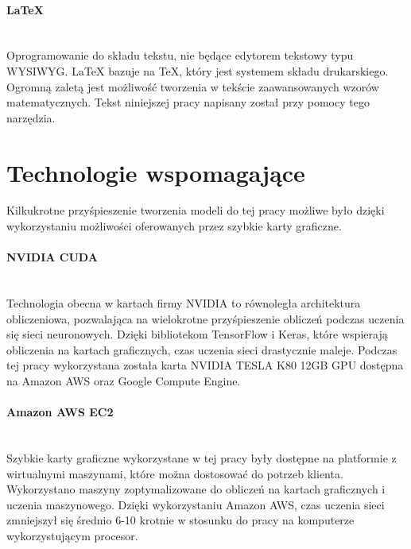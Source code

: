 \paragraph{LaTeX} \mbox{}\\
Oprogramowanie do składu tekstu, nie będące edytorem tekstowy typu WYSIWYG.
LaTeX bazuje na TeX, który jest systemem składu drukarskiego. Ogromną zaletą jest możliwość tworzenia w tekście zaawansowanych
wzorów matematycznych. Tekst niniejszej pracy napisany został przy pomocy tego narzędzia.

\section{Technologie wspomagające}
Kilkukrotne przyśpieszenie tworzenia modeli do tej pracy możliwe było dzięki wykorzystaniu
możliwości oferowanych przez szybkie karty graficzne.

\paragraph{NVIDIA CUDA} \mbox{}\\
Technologia obecna w kartach firmy NVIDIA to równoległa architektura obliczeniowa,
pozwalająca na wielokrotne przyśpieszenie obliczeń podczas uczenia się sieci neuronowych.
Dzięki bibliotekom TensorFlow i Keras, które wspierają obliczenia na kartach graficznych,
czas uczenia sieci drastycznie maleje. Podczas tej pracy wykorzystana została
karta NVIDIA TESLA K80 12GB GPU dostępna na Amazon AWS oraz Google Compute Engine.

\paragraph{Amazon AWS EC2} \mbox{}\\
Szybkie karty graficzne wykorzystane w tej pracy były dostępne na platformie z
wirtualnymi maszynami, które można dostosować do potrzeb klienta. Wykorzystano maszyny
zoptymalizowane do obliczeń na kartach graficznych i uczenia maszynowego.
Dzięki wykorzystaniu Amazon AWS, czas uczenia sieci zmniejszył się średnio 6-10 krotnie
w stosunku do pracy na komputerze wykorzystującym procesor.
